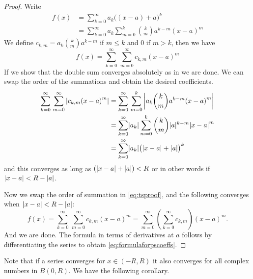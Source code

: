 \begin{proof}
Write
\begin{equation*}
\begin{split}
f(x) &= \sum_{k=0}^\infty a_k {\bigl((x-a)+a\bigr)}^k \\
&= \sum_{k=0}^\infty a_k \sum_{m=0}^k \binom{k}{m} a^{k-m} {(x-a)}^m %
\end{split}
\end{equation*}
We define $c_{k,m} = a_k \binom{k}{m} a^{k-m}$ if $m \leq k$ and $0$ if $m >
k$, then we have
\begin{equation} \label{eq:tsproof}
f(x) = \sum_{k=0}^\infty \, \sum_{m=0}^\infty c_{k,m} {(x-a)}^m
\end{equation}
If we show that the double sum converges absolutely as in  we
are done.  We can swap the order of the summations and obtain the desired
coefficients.
\begin{equation*}
\begin{split}
\sum_{k=0}^\infty \, \sum_{m=0}^\infty \left\lvert { c_{k,m} {(x-a)}^m} \right\rvert
& = \sum_{k=0}^\infty \, \sum_{m=0}^k \left\lvert { a_k \binom{k}{m} a^{k-m} {(x-a)}^m } \right\rvert
\\
& = \sum_{k=0}^\infty \lvert {a_k} \rvert \sum_{m=0}^k \binom{k}{m} \lvert {a} \rvert^{k-m}
{\lvert {x-a} \rvert}^m  \\
& = \sum_{k=0}^\infty \lvert {a_k} \rvert {\bigl(\lvert {x-a} \rvert+\lvert {a} \rvert\bigr)}^k
\end{split}
\end{equation*}
and this converges as long as 
$(\lvert {x-a} \rvert+\lvert {a} \rvert) < R$ or in other words if
$\lvert {x-a} \rvert < R-\lvert {a} \rvert$.

Now we swap the order of summation in \eqref{eq:tsproof}, and 
the following converges when $\lvert {x-a} \rvert < R-\lvert {a} \rvert$:
\begin{equation*}
f(x) =
\sum_{k=0}^\infty \, \sum_{m=0}^\infty c_{k,m} {(x-a)}^m
=
\sum_{m=0}^\infty
\left( \sum_{k=0}^\infty
c_{k,m} \right) {(x-a)}^m .
\end{equation*}
And we are done.  The formula in terms of derivatives at $a$ follows by
differentiating the series to obtain \eqref{eq:formulaforpscoeffs}.
\end{proof}

Note that if a series converges for $x \in (-R,R)$ it also converges
for all complex numbers in $B(0,R)$.
We have the following corollary.


